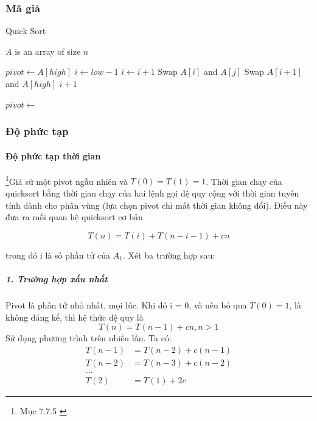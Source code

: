 \subsubsection{Mã giả}
 
\begin{algorithm}[H]
\caption{Quick Sort}
\label{alg:quick-sort}
\begin{algorithmic}

\Require $A$ is an array of size $n$

\State $pivot \gets A[high]$
\State $i \gets low - 1$
        \State $i \gets i + 1$
        \State Swap $A[i]$ and $A[j]$
    \EndIf
\EndFor
\State Swap $A[i+1]$ and $A[high]$
\State \Return $i+1$
\EndFunction

    \State $pivot \gets$  \State
     
    \State {} 
\EndIf
\EndFunction

\end{algorithmic}
\end{algorithm}


\subsubsection{Độ phức tạp}
\paragraph{Độ phức tạp thời gian}
\footnote{Mục 7.7.5 \cite{dsa-analysis-cpp}}Giả sử một pivot ngẫu nhiên và $T(0) = T(1) = 1$. Thời gian chạy của quicksort bằng thời gian chạy của hai lệnh gọi đệ quy cộng với thời gian tuyến tính dành cho phân vùng (lựa chọn pivot chỉ mất thời gian không đổi). Điều này đưa ra mối quan hệ quicksort cơ bản 

\begin{equation}
T(n) = T(i) + T(n - i - 1) + cn \tag{2.8.1} 
\end{equation}

trong đó i là số phần tử của $A_1$. Xét ba trường hợp sau:

\subparagraph{1. Trường hợp xấu nhất}

Pivot là phần tử nhỏ nhất, mọi lúc. Khi đó i = 0, và nếu bỏ qua $ T(0) = 1$, là không đáng kể, thì hệ thức đệ quy là 
$$T(n) = T(n - 1) + cn,  n > 1$$ 								 
Sử dụng phương trình trên nhiều lần. Ta có:
\begin{align*}
T(n - 1) &= T(n - 2) + c(n - 1) \\
T(n - 2) &= T(n - 3) + c(n - 2) \\
\dots \\
T(2) &= T(1) + 2c   
\end{align*}
	 
